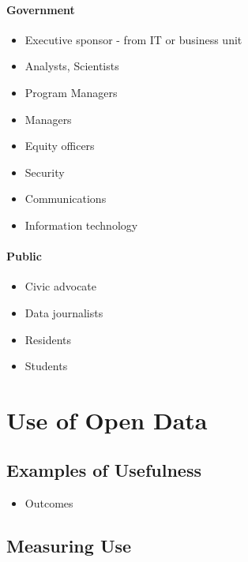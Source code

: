 \documentclass[
  openany]{book}
\providecommand{\tightlist}{%
  \setlength{\itemsep}{0pt}\setlength{\parskip}{0pt}}
\begin{document}
\hypertarget{government}{%
\subsubsection{Government}\label{government}}

\begin{itemize}
\tightlist
\item
  Executive sponsor - from IT or business unit
\item
  Analysts, Scientists
\item
  Program Managers
\item
  Managers
\item
  Equity officers
\item
  Security
\item
  Communications
\item
  Information technology
\end{itemize}

\hypertarget{public}{%
\subsubsection{Public}\label{public}}

\begin{itemize}
\tightlist
\item
  Civic advocate
\item
  Data journalists
\item
  Residents
\item
  Students
\end{itemize}

\hypertarget{use}{%
\chapter{Use of Open Data}\label{use}}

\hypertarget{examples-of-usefulness}{%
\section{Examples of Usefulness}\label{examples-of-usefulness}}

\begin{itemize}
\tightlist
\item
  Outcomes
\end{itemize}

\hypertarget{measuring-use}{%
\section{Measuring Use}\label{measuring-use}}
\end{document}
